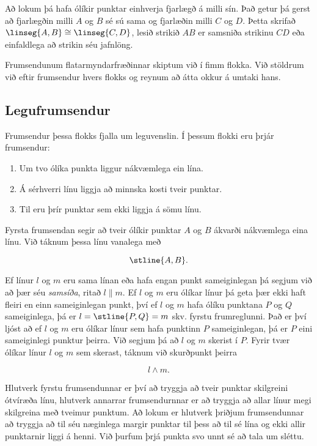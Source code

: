 Að lokum þá hafa ólíkir punktar einhverja fjarlægð á milli sín. Það getur þá gerst að fjarlægðin milli $A$ og $B$ sé sú sama og fjarlæðin milli $C$ og $D$. Þetta skrifað $\linseg{A,B} \cong \linseg{C,D}$, lesið strikið $AB$ er samsniða strikinu $CD$ eða einfaldlega að strikin séu jafnlöng.

Frumsendunum flatarmyndarfræðinnar skiptum við í fimm flokka. Við stöldrum við eftir frumsendur hvers flokks og reynum að átta okkur á umtaki hans.

\subsection{Legufrumsendur}
Frumsendur þessa flokks fjalla um leguvenslin. Í þessum flokki eru þrjár frumsendur:
\begin{enumerate}
	\item Um tvo ólíka punkta liggur nákvæmlega ein lína.

	\item Á sérhverri línu liggja að minnska kosti tveir punktar.

	\item Til eru þrír punktar sem ekki liggja á sömu línu.
\end{enumerate}

Fyrsta frumsendan segir að tveir ólíkir punktar $A$ og $B$ ákvarði nákvæmlega eina línu. Við táknum þessa línu vanalega með

$$
\stline{A,B}.
$$

Ef línur $l$ og $m$ eru sama línan eða hafa engan punkt sameiginlegan þá segjum við að þær séu \emph{samsíða}, ritað $l\parallel m$. Ef $l$ og $m$ eru ólíkar línur þá geta þær ekki haft fleiri en einn sameiginlegan punkt, því ef $l$ og $m$ hafa ólíku punktana $P$ og $Q$ sameiginlega, þá er $l=\stline{P,Q}=m$ skv. fyrstu frumreglunni. Það er því ljóst að ef $l$ og $m$ eru ólíkar línur sem hafa punktinn $P$ sameiginlegan, þá er $P$ eini sameiginlegi punktur þeirra. Við segjum þá að $l$ og $m$ skerist í $P$. Fyrir tvær ólíkar línur $l$ og $m$ sem skerast, táknum við skurðpunkt þeirra

$$
l\wedge m.
$$

Hlutverk fyrstu frumsendunnar er því að tryggja að tveir punktar skilgreini ótvíræða línu, hlutverk annarrar frumsendurnnar er að tryggja að allar línur megi skilgreina með tveimur punktum. Að lokum er hlutverk þriðjum frumsendunnar að tryggja að til séu næginlega margir punktar til þess að til sé lína og ekki allir punktarnir liggi á henni. Við þurfum þrjá punkta svo unnt sé að tala um sléttu.

